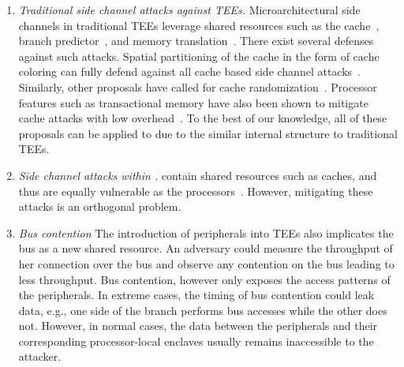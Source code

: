 \begin{enumerate}
  
\item \emph{Traditional side channel attacks against TEEs.}
Microarchitectural side channels in traditional TEEs leverage shared resources such as the cache~\cite{brasser2017software}, branch predictor~\cite{lee2017inferring}, and memory translation~\cite{xu2015controlled}. There exist several defenses against such attacks. Spatial partitioning of the cache in the form of cache coloring can fully defend against all cache based side channel attacks~\cite{costan2016sanctum,zhang2009cachecoloring,zhaosonicboom}. Similarly, other proposals have called for cache randomization~\cite{brasser2019dr,werner2019scattercache}. Processor features such as transactional memory have also been shown to mitigate cache attacks with low overhead~\cite{gruss2017strongsidechannel}. To the best of our knowledge, all of these proposals can be applied to \name{} due to the similar internal structure to traditional TEEs.


\item \emph{Side channel attacks within \sphw.}
\Sphw contain shared resources such as caches, and thus are equally vulnerable as the processors~\cite{naghibijouybari2018rendered,ramesh2018fpga,visor}. However, mitigating these attacks is an orthogonal problem.

\item \emph{Bus contention} The introduction of peripherals into TEEs also implicates the bus as a new shared resource. An adversary could measure the throughput of her connection over the bus and observe any contention on the bus leading to less throughput.
Bus contention, however only exposes the access patterns of the peripherals. In extreme cases, the timing of bus contention could leak data, e.g., one side of the branch performs bus accesses while the other does not. However, in normal cases, the data between the peripherals and their corresponding processor-local enclaves usually remains inaccessible to the attacker.

\end{enumerate}


